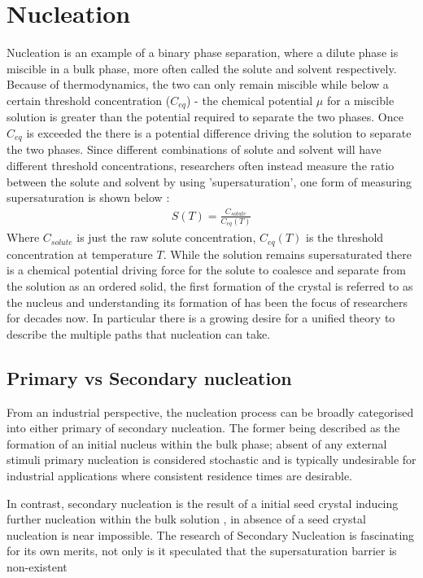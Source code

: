 \section{Nucleation}
Nucleation is an example of a binary phase separation, 
where a dilute phase is miscible in a bulk phase, more 
often called the solute and solvent respectively. Because 
of thermodynamics, the two can only remain miscible while 
below a certain threshold concentration ($C_{eq}$) 
- the chemical potential $\mu$ for a miscible solution 
is greater than the potential required to separate 
the two phases. Once $C_{eq}$ is exceeded the there is
a potential difference driving the solution to separate the 
two phases. Since different combinations of solute and solvent
will have different threshold concentrations, researchers often 
instead measure the ratio between the solute and solvent by using 
'supersaturation', one form of measuring supersaturation is shown 
below \cite{Mullin2001}:
\begin{align}
	S(T) = \frac{C_{solute}}{C_{eq}(T)}
\end{align}
Where $C_{solute}$ is just the raw solute concentration, $C_{eq}(T)$
is the threshold concentration at temperature $T$.
While the solution remains supersaturated there is a 
chemical potential driving force for the solute 
to coalesce and separate from the solution as an ordered solid, 
the first formation of the crystal is referred to as the 
nucleus and understanding its formation of has been the 
focus of researchers for decades now. In particular 
there is a growing desire for a unified theory to 
describe the multiple paths that nucleation can take.

\subsection{Primary vs Secondary nucleation}
From an industrial perspective, the nucleation process can
be broadly categorised into either primary of secondary 
nucleation. The former being described as the formation of an
initial nucleus within the bulk phase; absent of any external
stimuli primary nucleation is considered stochastic and is typically
undesirable for industrial applications where consistent 
residence times are desirable. 

In contrast, secondary nucleation is the result of a initial 
seed crystal inducing further nucleation within the bulk solution
\cite{Botsaris1976}, in absence of a seed crystal nucleation is
near impossible. The research of Secondary Nucleation is fascinating
for its own merits, not only is it speculated that the supersaturation 
barrier is non-existent \cite{Cashmore2022}   


